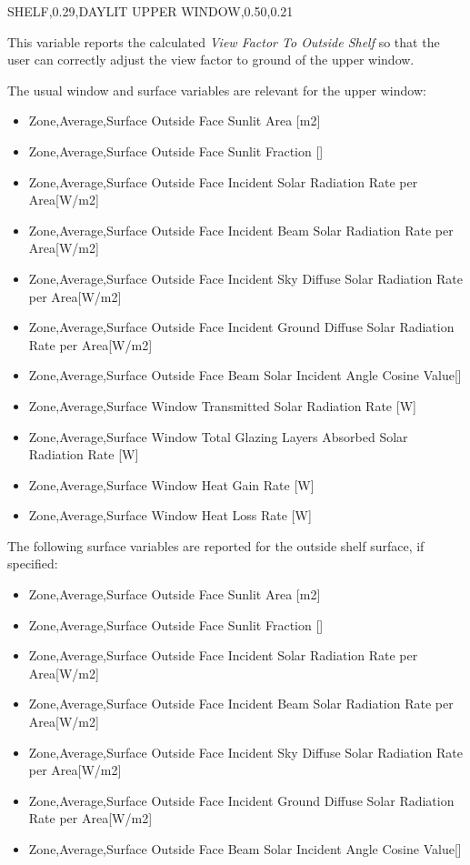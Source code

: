 SHELF,0.29,DAYLIT UPPER WINDOW,0.50,0.21

This variable reports the calculated \emph{View Factor To Outside Shelf} so that the user can correctly adjust the view factor to ground of the upper window.

The usual window and surface variables are relevant for the upper window:

\begin{itemize}
\item
  Zone,Average,Surface Outside Face Sunlit Area {[}m2{]}
\item
  Zone,Average,Surface Outside Face Sunlit Fraction {[]}
\item
  Zone,Average,Surface Outside Face Incident Solar Radiation Rate per Area{[}W/m2{]}
\item
  Zone,Average,Surface Outside Face Incident Beam Solar Radiation Rate per Area{[}W/m2{]}
\item
  Zone,Average,Surface Outside Face Incident Sky Diffuse Solar Radiation Rate per Area{[}W/m2{]}
\item
  Zone,Average,Surface Outside Face Incident Ground Diffuse Solar Radiation Rate per Area{[}W/m2{]}
\item
  Zone,Average,Surface Outside Face Beam Solar Incident Angle Cosine Value{[]}
\item
  Zone,Average,Surface Window Transmitted Solar Radiation Rate {[}W{]}
\item
  Zone,Average,Surface Window Total Glazing Layers Absorbed Solar Radiation Rate {[}W{]}
\item
  Zone,Average,Surface Window Heat Gain Rate {[}W{]}
\item
  Zone,Average,Surface Window Heat Loss Rate {[}W{]}
\end{itemize}

The following surface variables are reported for the outside shelf surface, if specified:

\begin{itemize}
\item
  Zone,Average,Surface Outside Face Sunlit Area {[}m2{]}
\item
  Zone,Average,Surface Outside Face Sunlit Fraction {[]}
\item
  Zone,Average,Surface Outside Face Incident Solar Radiation Rate per Area{[}W/m2{]}
\item
  Zone,Average,Surface Outside Face Incident Beam Solar Radiation Rate per Area{[}W/m2{]}
\item
  Zone,Average,Surface Outside Face Incident Sky Diffuse Solar Radiation Rate per Area{[}W/m2{]}
\item
  Zone,Average,Surface Outside Face Incident Ground Diffuse Solar Radiation Rate per Area{[}W/m2{]}
\item
  Zone,Average,Surface Outside Face Beam Solar Incident Angle Cosine Value{[]}
\end{itemize}


